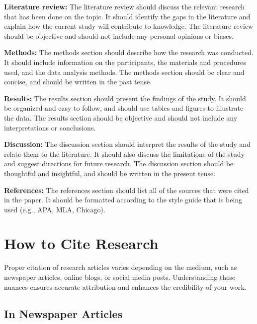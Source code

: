 \documentclass[
]{book}
\begin{document}
\textbf{Literature review:} The literature review should discuss the relevant research that has been done on the topic. It should identify the gaps in the literature and explain how the current study will contribute to knowledge. The literature review should be objective and should not include any personal opinions or biases.

\textbf{Methods:} The methods section should describe how the research was conducted. It should include information on the participants, the materials and procedures used, and the data analysis methods. The methods section should be clear and concise, and should be written in the past tense.

\textbf{Results:} The results section should present the findings of the study. It should be organized and easy to follow, and should use tables and figures to illustrate the data. The results section should be objective and should not include any interpretations or conclusions.

\textbf{Discussion:} The discussion section should interpret the results of the study and relate them to the literature. It should also discuss the limitations of the study and suggest directions for future research. The discussion section should be thoughtful and insightful, and should be written in the present tense.

\textbf{References:} The references section should list all of the sources that were cited in the paper. It should be formatted according to the style guide that is being used (e.g., APA, MLA, Chicago).

\hypertarget{how-to-cite-research}{%
\section*{How to Cite Research}\label{how-to-cite-research}}

Proper citation of research articles varies depending on the medium, such as newspaper articles, online blogs, or social media posts. Understanding these nuances ensures accurate attribution and enhances the credibility of your work.

\hypertarget{in-newspaper-articles}{%
\subsection*{In Newspaper Articles}\label{in-newspaper-articles}}
\end{document}
